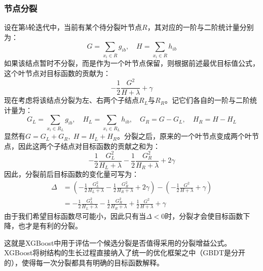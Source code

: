 \subsubsection{节点分裂}
设在第$b$轮迭代中，当前有某个待分裂叶节点$R$，其对应的一阶与二阶统计量分别为：
\begin{equation*}
	G=\sum_{x_i\in R}g_{ib},
	\quad
	H=\sum_{x_i\in R}h_{ib}
\end{equation*}
如果该结点暂时不分裂，而是作为一个叶节点保留，则根据前述最优目标值公式，这个叶节点对目标函数的贡献为：
\begin{equation*}
	-\frac{1}{2}\frac{G^2}{H+\lambda}+\gamma
\end{equation*}
现在考虑将该结点分裂为左、右两个子结点$R_L$与$R_R$。记它们各自的一阶与二阶统计量为：
\begin{equation*}
	G_L=\sum_{x_i\in R_L}g_{ib},
	\quad
	H_L=\sum_{x_i\in R_L}h_{ib},
	\quad
	G_R=G-G_L,
	\quad
	H_R=H-H_L
\end{equation*}
显然有$G=G_L+G_R,\;H=H_L+H_R$。分裂之后，原来的一个叶节点变成两个叶节点，因此这两个子结点对目标函数的贡献之和为：
\begin{equation*}
	-\frac{1}{2}\frac{G_L^2}{H_L+\lambda}
	-\frac{1}{2}\frac{G_R^2}{H_R+\lambda}
	+2\gamma
\end{equation*}
因此，分裂前后目标函数的变化量可写为：
\begin{align*}
	\Delta
	&=
	\left(
	-\frac{1}{2}\frac{G_L^2}{H_L+\lambda}
	-\frac{1}{2}\frac{G_R^2}{H_R+\lambda}
	+2\gamma
	\right)
	-
	\left(
	-\frac{1}{2}\frac{G^2}{H+\lambda}
	+\gamma
	\right) \\
	&=
	-\frac{1}{2}\frac{G_L^2}{H_L+\lambda}
	-\frac{1}{2}\frac{G_R^2}{H_R+\lambda}
	+\frac{1}{2}\frac{G^2}{H+\lambda}
	+\gamma
\end{align*}
由于我们希望目标函数尽可能小，因此只有当$\Delta<0$时，分裂才会使目标函数下降，也才是有利的分裂。\par
这就是XGBoost中用于评估一个候选分裂是否值得采用的分裂增益公式。XGBoost将树结构的生长过程直接纳入了统一的优化框架之中（GBDT是分开的），使得每一次分裂都具有明确的目标函数解释。
